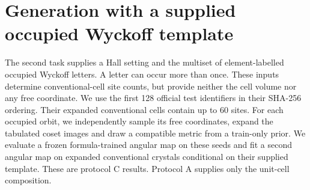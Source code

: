 \section{Generation with a supplied occupied Wyckoff template}\label{sec:wyckoff}
The second task supplies a Hall setting and the multiset of element-labelled occupied Wyckoff letters. A letter can occur more than once. These inputs determine conventional-cell site counts, but provide neither the cell volume nor any free coordinate. We use the first 128 official test identifiers in their SHA-256 ordering. Their expanded conventional cells contain up to 60 sites. For each occupied orbit, we independently sample its free coordinates, expand the tabulated coset images and draw a compatible metric from a train-only prior. We evaluate a frozen formula-trained angular map on these seeds and fit a second angular map on expanded conventional crystals conditional on their supplied template. These are protocol C results. Protocol A supplies only the unit-cell composition.

